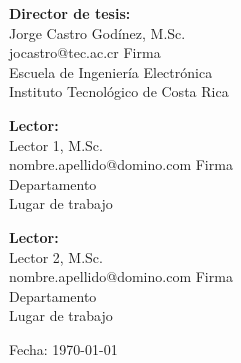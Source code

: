 \documentclass[letterpaper,12pt,spanish]{article}
\begin{document}
{\small
{\bf Director de tesis:} \\
Jorge Castro Godínez, M.Sc. \\
jocastro@tec.ac.cr \hfill Firma \underline{\hspace{5.5cm}} \\
Escuela de Ingeniería Electrónica \\
Instituto Tecnológico de Costa Rica

\vspace{0.5cm}

{\bf Lector:} \\
Lector 1, M.Sc. \\
nombre.apellido@domino.com \hfill Firma \underline{\hspace{5.5cm}} \\
Departamento \\
Lugar de trabajo

\vspace{0.5cm}

{\bf Lector:} \\
Lector 2, M.Sc. \\
nombre.apellido@domino.com \hfill Firma \underline{\hspace{5.5cm}} \\
Departamento \\
Lugar de trabajo

\vspace{0.5cm}

Fecha: {\today}
}
\end{document}
